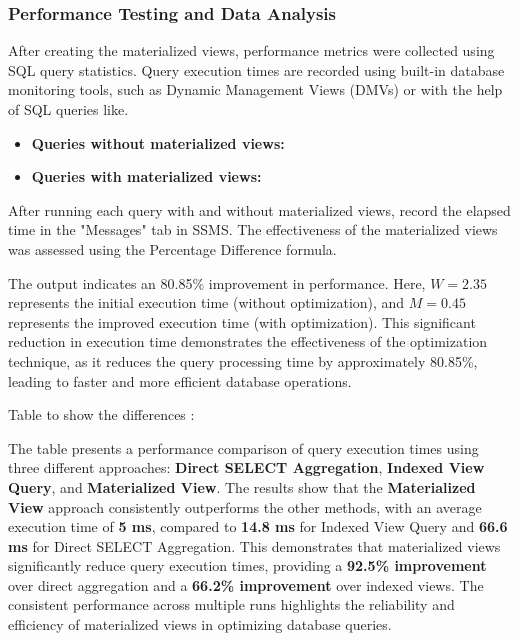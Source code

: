 

\subsubsection{Performance Testing and Data Analysis} After creating the materialized views, performance metrics were collected using SQL query statistics. Query execution times are recorded using built-in database monitoring tools, such as Dynamic Management Views (DMVs) or with the help of SQL queries like. 

 

\begin{itemize}
    \item \textbf{Queries without materialized views:}
    \item \textbf{Queries with materialized views:}
\end{itemize}

After running each query with and without materialized views, record the elapsed time in the "Messages" tab in SSMS. The effectiveness of the materialized views was assessed using the Percentage Difference formula.

The output indicates an 80.85\% improvement in performance. Here, \( W = 2.35 \) represents the initial execution time (without optimization), and \( M = 0.45 \) represents the improved execution time (with optimization). This significant reduction in execution time demonstrates the effectiveness of the optimization technique, as it reduces the query processing time by approximately 80.85\%, leading to faster and more efficient database operations.

\clearpage
Table to show the differences :
 
 

 The table presents a performance comparison of query execution times using three different approaches: \textbf{Direct SELECT Aggregation}, \textbf{Indexed View Query}, and \textbf{Materialized View}. The results show that the \textbf{Materialized View} approach consistently outperforms the other methods, with an average execution time of \textbf{5 ms}, compared to \textbf{14.8 ms} for Indexed View Query and \textbf{66.6 ms} for Direct SELECT Aggregation. This demonstrates that materialized views significantly reduce query execution times, providing a \textbf{92.5\% improvement} over direct aggregation and a \textbf{66.2\% improvement} over indexed views. The consistent performance across multiple runs highlights the reliability and efficiency of materialized views in optimizing database queries.
 

